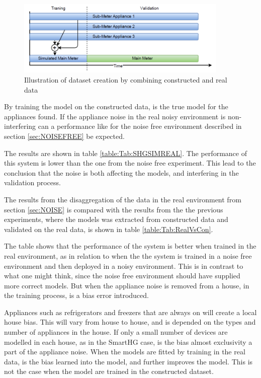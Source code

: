 \begin{figure}[H]
\centering
\includegraphics[width=0.9\textwidth]{billeder/SIMREAL.png}
\caption{Illustration of dataset creation by combining constructed and real data}
\label{fig:SHGSIMREAL}
\end{figure}

By training the model on the constructed data, is the true model for the appliances found. If the appliance noise in the real noisy environment is non-interfering can a performance like for the noise free environment described in section \ref{sec:NOISEFREE} be expected. 




The results are shown in table \ref{table:Tab:SHGSIMREAL}. The performance of this system is lower than the one from the noise free experiment. This lead to the conclusion that the noise is both affecting the models, and interfering in the validation process.  

The results from the disaggregation of the data in the real environment from section \ref{sec:NOISE} is compared with the results from the the previous experiments, where the models was extracted from constructed data and validated on the real data, is shown in table \ref{table:Tab:RealVsCon}. 



The table shows that the performance of the system is better when trained in the real environment, as in relation to when the the system is trained in a noise free environment and then deployed in a noisy environment. This is in contrast to what one might think, since the noise free environment should have supplied more correct models. But when the appliance noise is removed from a house, in the training process, is a bias error introduced. 

Appliances such as refrigerators and freezers that are always on will create a local house bias. This will vary from house to house, and is depended on the types and number of appliances in the house. If only a small number of devices are modelled in each house, as in the SmartHG case, is the bias almost exclusivity a part of the appliance noise. When the models are fitted by training in the real data, is the bias learned into the model, and further improves the model. This is not the case when the model are trained in the constructed dataset. 

